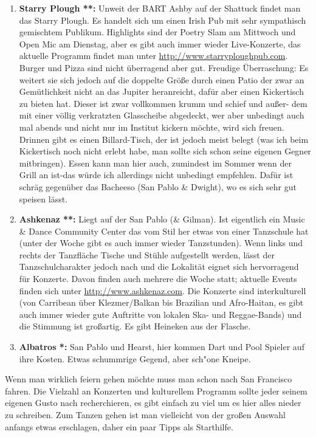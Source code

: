 \documentclass[a4paper]{scrreprt}
\begin{document}
\begin{enumerate}
  \item \textbf{Starry Plough **:} Unweit der BART Ashby auf der Shattuck findet man das Starry Plough. Es handelt sich um einen Irish Pub mit sehr sympathisch gemischtem Publikum. Highlights sind der Poetry Slam am Mittwoch und Open Mic am Dienstag, aber es gibt auch immer wieder Live-Konzerte, das aktuelle Programm findet man unter \url{http://www.starryploughpub.com}. Burger und Pizza sind nicht überragend aber gut. Freudige Überraschung: Es weitert sie sich jedoch auf die doppelte Größe durch einen Patio der zwar an Gemütlichkeit nicht an das Jupiter heranreicht, dafür aber einen Kickertisch zu bieten hat. Dieser ist zwar vollkommen krumm und schief und außer- dem mit einer völlig verkratzten Glasscheibe abgedeckt, wer aber unbedingt auch mal abends und nicht nur im Institut kickern möchte, wird sich freuen. Drinnen gibt es einen Billard-Tisch, der ist jedoch meist belegt (was ich beim Kickertisch noch nicht erlebt habe, man sollte sich schon seine eigenen Gegner mitbringen). Essen kann man hier auch, zumindest im Sommer wenn der Grill an ist-das würde ich allerdings nicht unbedingt empfehlen. Dafür ist schräg gegenüber das Bacheeso (San Pablo \& Dwight), wo es sich sehr gut speisen lässt.
  
  \item \textbf{Ashkenaz **:} Liegt auf der San Pablo (\& Gilman). Ist eigentlich ein Music \& Dance Community Center das vom Stil her etwas von einer Tanzschule hat (unter der Woche gibt es auch immer wieder Tanzstunden). Wenn links und rechts der Tanzfläche Tische und Stühle aufgestellt werden, lässt der Tanzschulcharakter jedoch nach und die Lokalität eignet sich hervorragend für Konzerte. Davon finden auch mehrere die Woche statt; aktuelle Events finden sich unter \url{http://www.ashkenaz.com}. Die Konzerte sind interkulturell (von Carribean über Klezmer/Balkan bis Brazilian und Afro-Haitan, es gibt auch immer wieder gute Auftritte von lokalen Ska- und Reggae-Bands) und die Stimmung ist großartig. Es gibt Heineken aus der Flasche.
  
  \item \textbf{Albatros *:} San Pablo und Hearst, hier kommen Dart und Pool Spieler auf ihre Kosten. Etwas schummrige Gegend, aber sch"one Kneipe.

\end{enumerate}
  
Wenn man wirklich feiern gehen möchte muss man schon nach San Francisco fahren. Die Vielzahl an Konzerten und kulturellem Programm sollte jeder seinem eigenen Gusto nach recherchieren, es gibt einfach zu viel um es hier alles nieder zu schreiben. Zum Tanzen gehen ist man vielleicht von der großen Auswahl anfangs etwas erschlagen, daher ein paar Tipps als Starthilfe.
\end{document}
